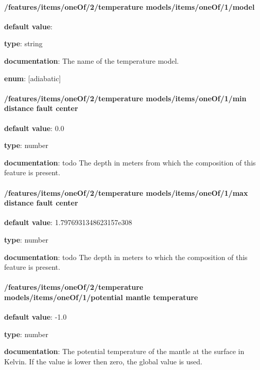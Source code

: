 \paragraph{/features/items/oneOf/2/temperature models/items/oneOf/1/model} \begin{itemized}
\item {\bf default value}: 
\item {\bf type}: string
\item {\bf documentation}: The name of the temperature model.
\item {\bf enum}: [adiabatic]\end{itemized}\paragraph{/features/items/oneOf/2/temperature models/items/oneOf/1/min distance fault center} \begin{itemized}
\item {\bf default value}: 0.0
\item {\bf type}: number
\item {\bf documentation}: todo The depth in meters from which the composition of this feature is present.
\end{itemized}\paragraph{/features/items/oneOf/2/temperature models/items/oneOf/1/max distance fault center} \begin{itemized}
\item {\bf default value}: 1.7976931348623157e308
\item {\bf type}: number
\item {\bf documentation}: todo The depth in meters to which the composition of this feature is present.
\end{itemized}\paragraph{/features/items/oneOf/2/temperature models/items/oneOf/1/potential mantle temperature} \begin{itemized}
\item {\bf default value}: -1.0
\item {\bf type}: number
\item {\bf documentation}: The potential temperature of the mantle at the surface in Kelvin. If the value is lower then zero, the global value is used.

\end{itemized}
